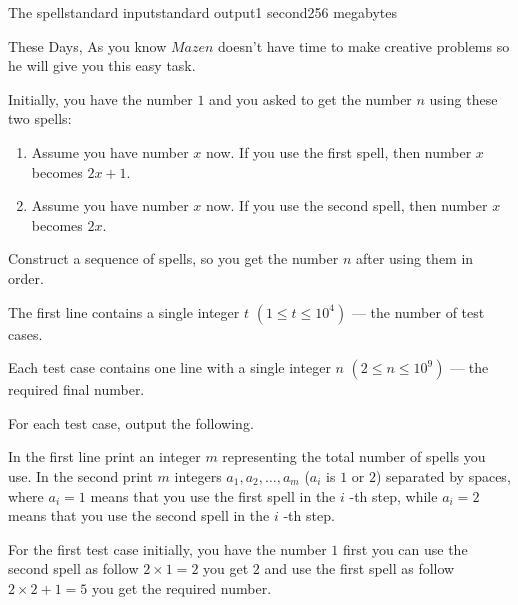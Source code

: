 \begin{problem}{The spell}{standard input}{standard output}{1 second}{256 megabytes}

These Days, As you know $Mazen$ doesn't have time to make creative problems so he will give you this easy task.

Initially, you have the number $1$ and you asked to get the number $n$ using these two spells:
\begin{enumerate}
  \item Assume you have number $x$ now. If you use the first spell, then number $x$
 becomes $2x+1$.
  \item Assume you have number $x$ now. If you use the second spell, then number $x$
 becomes $2x$.
\end{enumerate}
Construct a sequence of spells, so you get the number $n$ after using them in order.

\InputFile
The first line contains a single integer $t$ $(1≤t≤10^4)$ --- the number of test cases.

Each test case contains one line with a single integer $n$ $(2≤n≤10^9)$ --- the required final number.

\OutputFile
For each test case, output the following.

In the first line print an integer $m$ representing the total number of spells you use.
In the second print $m$ integers $a_1,a_2,\ldots,a_m$
 ($a_i$ is $1$ or $2$) separated by spaces, where $a_i=1$
 means that you use the first spell in the $i$
-th step, while $a_i=2$
 means that you use the second spell in the $i$
-th step.

\Example

\begin{example}
%
\end{example}

\Note
For the first test case initially, you have the number $1$ first you can use the second spell
as follow $2 \times 1 = 2$ you get $2$ and use the first spell as follow $2 \times 2 + 1 = 5$ you get the required number.

\end{problem}

